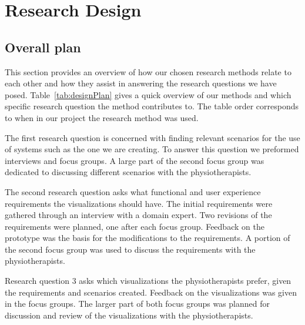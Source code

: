 \chapter{Research Design}
\label{ch:researchDesign}
\section{Overall plan}
\label{sec:overview}

This section provides an overview of how our chosen research methods relate to each other and how they assist in answering the research questions we have posed. Table~\ref{tab:designPlan} gives a quick overview of our methods and which specific research question the method contributes to. The table order corresponds to when in our project the research method was used.

The first research question is concerned with finding relevant scenarios for the use of systems such as the one we are creating. To answer this question we preformed interviews and focus groups. A large part of the second focus group was dedicated to discussing different scenarios with the physiotherapists.

The second research question asks what functional and user experience requirements the visualizations should have. The initial requirements were gathered through an interview with a domain expert. Two revisions of the requirements were planned, one after each focus group. Feedback on the prototype was the basis for the modifications to the requirements. A portion of the second focus group was used to discuss the requirements with the physiotherapists.

Research question 3 asks which visualizations the physiotherapists prefer, given the requirements and scenarios created. Feedback on the visualizations was given in the focus groups. The larger part of both focus groups was planned for discussion and review of the visualizations with the physiotherapists. 

